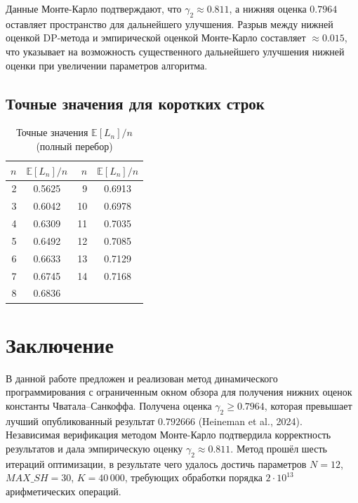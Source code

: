 \documentclass[12pt,a4paper]{article}
\begin{document}
Данные Монте-Карло подтверждают, что $\gamma_2 \approx 0.811$, а нижняя оценка $0.7964$ оставляет пространство для дальнейшего улучшения.
Разрыв между нижней оценкой DP-метода и эмпирической оценкой Монте-Карло составляет $\approx 0.015$, что указывает на возможность существенного дальнейшего улучшения нижней оценки при увеличении параметров алгоритма.

\subsection{Точные значения для коротких строк}

\begin{table}[h]
\centering
\caption{Точные значения $\mathbb{E}[L_n]/n$ (полный перебор)}
\label{tab:exact}
\begin{tabular}{rc|rc}
  \toprule
  $n$ & $\mathbb{E}[L_n]/n$ & $n$ & $\mathbb{E}[L_n]/n$ \\
  \midrule
  2 & 0.5625 & 9 & 0.6913 \\
  3 & 0.6042 & 10 & 0.6978 \\
  4 & 0.6309 & 11 & 0.7035 \\
  5 & 0.6492 & 12 & 0.7085 \\
  6 & 0.6633 & 13 & 0.7129 \\
  7 & 0.6745 & 14 & 0.7168 \\
  8 & 0.6836 & & \\
  \bottomrule
\end{tabular}
\end{table}

\section{Заключение}

В данной работе предложен и реализован метод динамического программирования с ограниченным окном обзора для получения нижних оценок константы Чватала--Санкоффа.
Получена оценка $\gamma_2 \geq 0.7964$, которая превышает лучший опубликованный результат $0.792666$ (Heineman et al., 2024).
Независимая верификация методом Монте-Карло подтвердила корректность результатов и дала эмпирическую оценку $\gamma_2 \approx 0.811$.
Метод прошёл шесть итераций оптимизации, в результате чего удалось достичь параметров $N = 12$, $\mathit{MAX\_SH} = 30$, $K = 40\,000$, требующих обработки порядка $2 \cdot 10^{13}$ арифметических операций.
\end{document}
